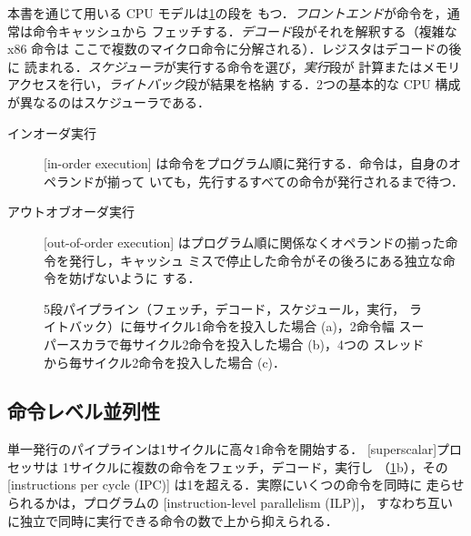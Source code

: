 \documentclass[../main.tex]{subfiles}
\begin{document}
本書を通じて用いる CPU モデルは\cref{fig:l01-cpu-pipeline}の段を
もつ．\emph{フロントエンド}が命令を，通常は命令キャッシュから
フェッチする．\emph{デコード}段がそれを解釈する（複雑な x86 命令は
ここで複数のマイクロ命令に分解される）．レジスタはデコードの後に
読まれる．\emph{スケジューラ}が実行する命令を選び，\emph{実行}段が
計算またはメモリアクセスを行い，\emph{ライトバック}段が結果を格納
する．2つの基本的な CPU
構成が異なるのはスケジューラである．
\begin{description}
  \item[インオーダ実行] [in-order execution]
    は命令をプログラム順に発行する．命令は，自身のオペランドが揃って
    いても，先行するすべての命令が発行されるまで待つ．
  \item[アウトオブオーダ実行] [out-of-order execution]
    はプログラム順に関係なくオペランドの揃った命令を発行し，キャッシュ
    ミスで停止した命令がその後ろにある独立な命令を妨げないように
    する．
\end{description}

\begin{figure}[htbp]
  \centering
  
  \caption{5段パイプライン（フェッチ，デコード，スケジュール，実行，
    ライトバック）に毎サイクル1命令を投入した場合 (a)，2命令幅
    スーパースカラで毎サイクル2命令を投入した場合 (b)，4つの
    スレッドから毎サイクル2命令を投入した場合 (c)．}
  \label{fig:l01-cpu-pipeline}
\end{figure}

\subsection{命令レベル並列性}

単一発行のパイプラインは1サイクルに高々1命令を開始する．
[superscalar]プロセッサは
1サイクルに複数の命令をフェッチ，デコード，実行し
（\cref{fig:l01-cpu-pipeline}b），その
[instructions per cycle (IPC)]
は1を超える．実際にいくつの命令を同時に
走らせられるかは，プログラムの
[instruction-level parallelism (ILP)]，
すなわち互いに独立で同時に実行できる命令の数で上から抑えられる．
\end{document}
